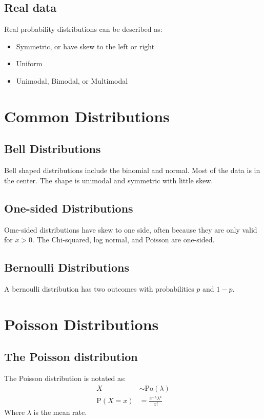 \subsection{Real data}
Real probability distributions can be described as:
\begin{itemize}
    \item Symmetric, or have skew to the left or right
    \item Uniform
    \item Unimodal, Bimodal, or Multimodal
\end{itemize}

\section{Common Distributions}
\subsection{Bell Distributions}
Bell shaped distributions include the binomial and normal. Most of the data is in the center. The shape is unimodal and symmetric with little skew.

\subsection{One-sided Distributions}
Ome-sided distributions have skew to one side, often because they are only valid for \(x > 0\). The Chi-squared, log normal, and Poisson are one-sided.

\subsection{Bernoulli Distributions}
A bernoulli distribution has two outcomes with probabilities \(p\) and \(1 - p\).

\section{Poisson Distributions}
\subsection{The Poisson distribution}
The Poisson distribution is notated as:
\begin{align*}
    X                 & \sim \mathrm{Po}(\lambda)          \\
    \mathrm{P}(X = x) & = \frac{e^{-\lambda}\lambda^x}{x!}
\end{align*}
Where \(\lambda\) is the mean rate.

